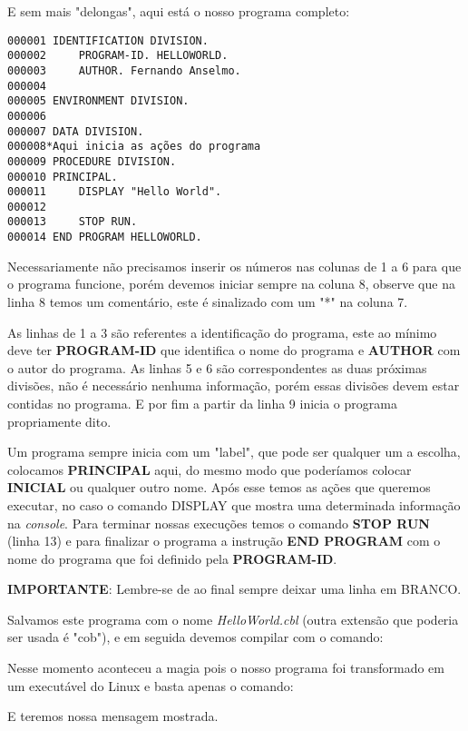 E sem mais "delongas", aqui está o nosso programa completo:
\begin{lstlisting}[]
000001 IDENTIFICATION DIVISION.
000002     PROGRAM-ID. HELLOWORLD.
000003     AUTHOR. Fernando Anselmo.
000004
000005 ENVIRONMENT DIVISION.
000006       
000007 DATA DIVISION.
000008*Aqui inicia as ações do programa    
000009 PROCEDURE DIVISION.
000010 PRINCIPAL.
000011     DISPLAY "Hello World".
000012
000013     STOP RUN.
000014 END PROGRAM HELLOWORLD.

\end{lstlisting}

Necessariamente não precisamos inserir os números nas colunas de 1 a 6 para que o programa funcione, porém devemos iniciar sempre na coluna 8, observe que na linha 8 temos um comentário, este é sinalizado com um "*" na coluna 7.

As linhas de 1 a 3 são referentes a identificação do programa, este ao mínimo deve ter \textbf{PROGRAM-ID} que identifica o nome do programa e \textbf{AUTHOR} com o autor do programa. As linhas 5 e 6 são correspondentes as duas próximas divisões, não é necessário nenhuma informação, porém essas divisões devem estar contidas no programa. E por fim a partir da linha 9 inicia o programa propriamente dito.

Um programa sempre inicia com um "label", que pode ser qualquer um a escolha, colocamos \textbf{PRINCIPAL} aqui, do mesmo modo que poderíamos colocar \textbf{INICIAL} ou qualquer outro nome. Após esse temos as ações que queremos executar, no caso o comando DISPLAY que mostra uma determinada informação na \textit{console}. Para terminar nossas execuções temos o comando \textbf{STOP RUN} (linha 13) e para finalizar o programa a instrução \textbf{END PROGRAM} com o nome do programa que foi definido pela \textbf{PROGRAM-ID}.

\textbf{IMPORTANTE}: Lembre-se de ao final sempre deixar uma linha em BRANCO.

Salvamos este programa com o nome \textit{HelloWorld.cbl} (outra extensão que poderia ser usada é "cob"), e em seguida devemos compilar com o comando: \\

Nesse momento aconteceu a magia pois o nosso programa foi transformado em um executável do Linux e basta apenas o comando: \\

E teremos nossa mensagem mostrada.

